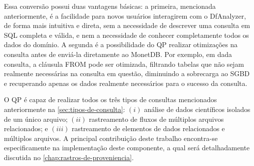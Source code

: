Essa conversão possui duas vantagens básicas: a primeira, mencionada anteriormente, é a facilidade para novos usuários interagirem com o DfAnalyzer, de forma mais intuitiva e direta, sem a necessidade de descrever uma consulta em SQL completa e válida, e nem a necessidade de conhecer completamente todos os dados do domínio. A segunda é a possibilidade do QP realizar otimizações na consulta antes de enviá-la diretamente ao MonetDB. Por exemplo, em dada consulta, a cláusula \textsc{FROM} pode ser otimizada, filtrando tabelas que não sejam realmente necessárias na consulta em questão, diminuindo a sobrecarga ao SGBD e recuperando apenas os dados realmente necessários para o sucesso da consulta.

O QP é capaz de realizar todos os três tipos de consultas mencionados anteriormente na \autoref{sec:tipos-de-consulta}: \((i)\) análise de dados científicos isolados de um único arquivo; \((ii)\) rastreamento de fluxos de múltiplos arquivos relacionados; e \((iii)\) rastreamento de elementos de dados relacionados e múltiplos arquivos. 
A principal contribuição deste trabalho encontra-se especificamente na implementação deste componente, a qual será detalhadamente discutida no \autoref{chap:rastros-de-proveniencia}.